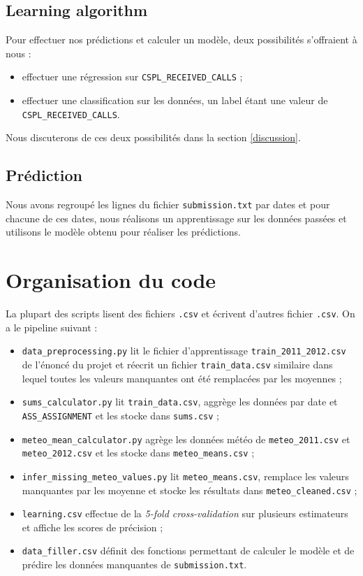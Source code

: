 \documentclass[a4paper,11pt,french]{article}
\begin{document}
    \subsection{Learning algorithm}

    Pour effectuer nos prédictions et calculer un modèle, deux possibilités s'offraient à nous :
    \begin{itemize}
        \item effectuer une régression sur \verb|CSPL_RECEIVED_CALLS| ;
        \item effectuer une classification sur les données, un label étant une valeur de \verb|CSPL_RECEIVED_CALLS|.
    \end{itemize}
    Nous discuterons de ces deux possibilités dans la section \ref{discussion}.

    \subsection{Prédiction}

    Nous avons regroupé les lignes du fichier \verb|submission.txt| par dates et pour chacune de ces dates, nous réalisons un apprentissage sur les données passées et utilisons le modèle obtenu pour réaliser les prédictions.

    \section{Organisation du code}

    La plupart des scripts lisent des fichiers \verb|.csv| et écrivent d'autres fichier \verb|.csv|. On a le pipeline suivant :
    \begin{itemize}
        \item \verb|data_preprocessing.py| lit le fichier d'apprentissage \verb|train_2011_2012.csv| de l'énoncé du projet et réecrit un fichier \verb|train_data.csv| similaire dans lequel toutes les valeurs manquantes ont été remplacées par les moyennes ;
        \item \verb|sums_calculator.py| lit \verb|train_data.csv|, aggrège les données par date et \verb|ASS_ASSIGNMENT| et les stocke dans \verb|sums.csv| ;
        \item \verb|meteo_mean_calculator.py| agrège les données météo de \verb|meteo_2011.csv| et \verb|meteo_2012.csv| et les stocke dans \verb|meteo_means.csv| ;
        \item \verb|infer_missing_meteo_values.py| lit \verb|meteo_means.csv|, remplace les valeurs manquantes par les moyenne et stocke les résultats dans \verb|meteo_cleaned.csv| ;
        \item \verb|learning.csv| effectue de la \emph{5-fold cross-validation} sur plusieurs estimateurs et affiche les scores de précision ;
        \item \verb|data_filler.csv| définit des fonctions permettant de calculer le modèle et de prédire les données manquantes de \verb|submission.txt|.
    \end{itemize}
\end{document}
